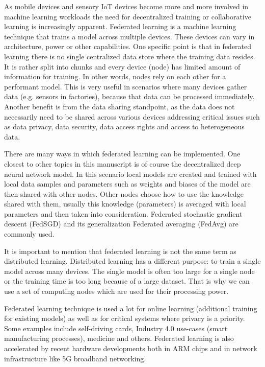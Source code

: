 \documentclass[b5paper]{book}
\let\cite\parencite
\begin{document}
As mobile devices and sensory IoT devices become more and more involved in machine learning workloads the need for decentralized training or collaborative learning is increasingly apparent. Federated learning \cite{li2020federated} is a machine learning technique that trains a model across multiple devices. These devices can vary in architecture, power or other capabilities. One specific point is that in federated learning there is no single centralized data store where the training data resides. It is rather split into chunks and every device (node) has limited amount of information for training. In other words, nodes rely on each other for a performant model. This is very useful in scenarios where many devices gather data (e.g. sensors in factories), because that data can be processed immediately. Another benefit is from the data sharing standpoint, as the data does not necessarily need to be shared across various devices addressing critical issues such as data privacy, data security, data access rights and access to heterogeneous data.

There are many ways in which federated learning can be implemented. One closest to other topics in this manuscript is of course the decentralized deep neural network model. In this scenario local models are created and trained with local data samples and parameters such as weights and biases of the model are then shared with other nodes. Other nodes choose how to use the knowledge shared with them, usually this knowledge (parameters) is averaged with local parameters and then taken into consideration. Federated stochastic gradient descent (FedSGD) and its generalization Federated averaging (FedAvg) are commonly used.

It is important to mention that federated learning is not the same term as distributed learning. Distributed learning has a different purpose: to train a single model across many devices. The single model is often too large for a single node or the training time is too long because of a large dataset. That is why we can use a set of computing nodes which are used for their processing power.

Federated learning technique is used a lot for online learning (additional training for existing models) as well as for critical systems where privacy is a priority. Some examples include self-driving cards, Industry 4.0 use-cases (smart manufacturing processes), medicine and others. \cite{arapakis2019towards} Federated learning is also accelerated by recent hardware developments both in ARM chips and in network infrastructure like 5G broadband networking.
\end{document}
